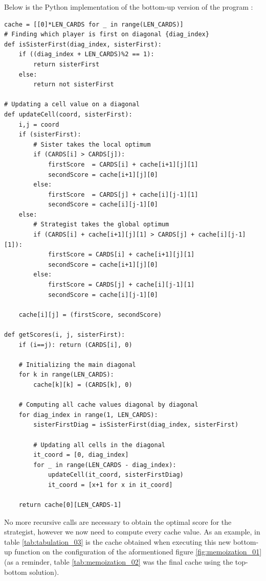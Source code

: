 \documentclass[a4paper,12pt,fleqn]{article}
\begin{document}
\noindent
Below is the Python implementation of the bottom-up version of the program :

\begin{verbatim}
cache = [[0]*LEN_CARDS for _ in range(LEN_CARDS)]
# Finding which player is first on diagonal {diag_index}
def isSisterFirst(diag_index, sisterFirst):
    if ((diag_index + LEN_CARDS)%2 == 1):
        return sisterFirst
    else:
        return not sisterFirst

# Updating a cell value on a diagonal
def updateCell(coord, sisterFirst):
    i,j = coord
    if (sisterFirst):
        # Sister takes the local optimum
        if (CARDS[i] > CARDS[j]):
            firstScore  = CARDS[i] + cache[i+1][j][1]
            secondScore = cache[i+1][j][0]
        else:
            firstScore  = CARDS[j] + cache[i][j-1][1]
            secondScore = cache[i][j-1][0]
    else:
        # Strategist takes the global optimum
        if (CARDS[i] + cache[i+1][j][1] > CARDS[j] + cache[i][j-1][1]):
            firstScore = CARDS[i] + cache[i+1][j][1]
            secondScore = cache[i+1][j][0]
        else:
            firstScore = CARDS[j] + cache[i][j-1][1]
            secondScore = cache[i][j-1][0]
    
    cache[i][j] = (firstScore, secondScore)

def getScores(i, j, sisterFirst):
    if (i==j): return (CARDS[i], 0)

    # Initializing the main diagonal
    for k in range(LEN_CARDS):
        cache[k][k] = (CARDS[k], 0)

    # Computing all cache values diagonal by diagonal
    for diag_index in range(1, LEN_CARDS):
        sisterFirstDiag = isSisterFirst(diag_index, sisterFirst)

        # Updating all cells in the diagonal
        it_coord = [0, diag_index]
        for _ in range(LEN_CARDS - diag_index):
            updateCell(it_coord, sisterFirstDiag)
            it_coord = [x+1 for x in it_coord]

    return cache[0][LEN_CARDS-1]
\end{verbatim}

No more recursive calls are necessary to obtain the optimal score for the strategist, however we now need to compute every cache value.
As an example, in table \ref{tab:tabulation_03} is the cache obtained when executing this new bottom-up function on the configuration of the aformentioned figure \ref{fig:memoization_01} (as a reminder, table \ref{tab:memoization_02} was the final cache using the top-bottom solution).
\end{document}
